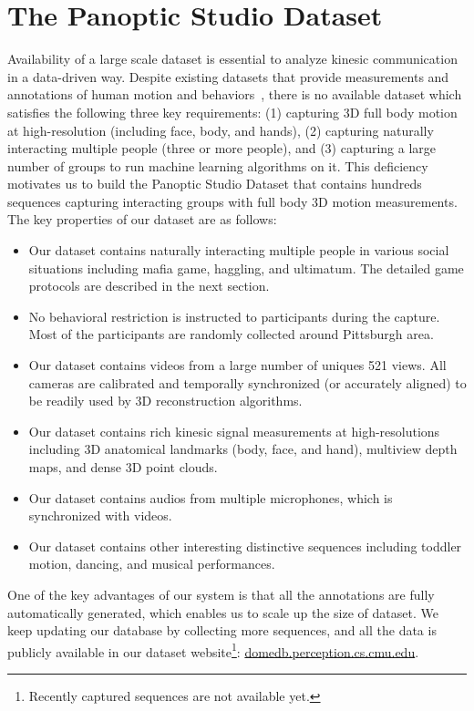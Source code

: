 
\chapter{The Panoptic Studio Dataset}
\label{chapter:dataset}
Availability of a large scale dataset is essential to analyze kinesic communication in a data-driven way. Despite existing datasets that provide measurements and annotations of human motion and behaviors~\cite{carletta2005ami, Lepri-12, Zen-10,Cristani-11, SALSA-15, h36m_pami}, there is no available dataset which satisfies the following three key requirements: (1) capturing 3D full body motion at high-resolution (including face, body, and hands), (2) capturing naturally interacting multiple people (three or more people), and (3) capturing a large number of groups to run machine learning algorithms on it. This deficiency motivates us to build the Panoptic Studio Dataset that contains hundreds sequences capturing interacting groups with full body 3D motion measurements. The key properties of our dataset are as follows:
\begin{itemize}
	\item Our dataset contains naturally interacting multiple people in various social situations including mafia game, haggling, and ultimatum. The detailed game protocols are described in the next section.
	\item No behavioral restriction is instructed to participants during the capture. Most of the participants are randomly collected around Pittsburgh area. 
	\item Our dataset contains videos from a large number of uniques 521 views. All cameras are calibrated and temporally synchronized (or accurately aligned) to be readily used by 3D reconstruction algorithms.
	\item Our dataset contains rich kinesic signal measurements at high-resolutions including 3D anatomical landmarks (body, face, and hand), multiview depth maps, and dense 3D point clouds.
	\item Our dataset contains audios from multiple microphones, which is synchronized with videos. 		
	\item Our dataset contains other interesting distinctive sequences including toddler motion, dancing, and musical performances.
\end{itemize}

One of the key advantages of our system is that all the annotations are fully automatically generated, which enables us to scale up the size of dataset. We keep updating our database by collecting more sequences, and all the data is publicly available in our dataset website\footnote{Recently captured sequences are not available yet.}: \url{domedb.perception.cs.cmu.edu}. 

